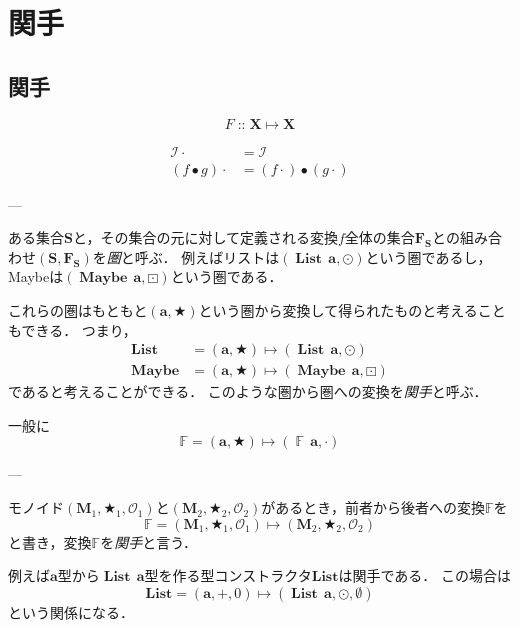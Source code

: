 \documentclass[twocolumn]{jsbook}
\newcommand{\keyword}[1]{\emph{#1}}
\newcommand{\typename}[1]{\mathbf{#1}}
\newcommand{\typeconstructor}[2]{\mathop{#1}\,#2}
\newcommand{\typelist}{\typename{List}}
\newcommand{\typemaybe}{\typename{Maybe}}
\newcommand{\constantempty}{\emptyset}
\newcommand{\binarycompose}{\bullet}
\newcommand{\binaryfunctormap}{\cdot}
\newcommand{\binarylistfunctormap}{\odot}
\newcommand{\binarymaybefunctormap}{\boxdot}
\newcommand{\istypeof}{\mathop{::}}
\newcommand{\mathbinaryop}{\bigstar}
\newcommand{\mathidentity}{\mathcal{O}}
\newcommand{\mathidentitymorph}{\mathcal{I}}
\newcommand{\mathsetname}[1]{\boldsymbol{#1}}
\newcommand{\mathfunctorname}[1]{\mathbb{#1}}
\begin{document}
\chapter{関手}

\section{関手}

$$F\istypeof\mathsetname{X}\mapsto\mathsetname{X}$$

\begin{align}
\mathidentitymorph\binaryfunctormap&=\mathidentitymorph\\
(f\binarycompose g)\binaryfunctormap&=(f\binaryfunctormap)\binarycompose(g\binaryfunctormap)
\end{align}


---

ある集合$\mathsetname{S}$と，その集合の元に対して定義される変換$f$全体の集合$\mathsetname{F}_{\mathsetname{S}}$との組み合わせ$(\mathsetname{S},\mathsetname{F}_{\mathsetname{S}})$を\keyword{圏}と呼ぶ．
例えばリストは$(\typeconstructor{\typelist}{\typename{a}},\binarylistfunctormap)$という圏であるし，Maybeは$(\typeconstructor{\typemaybe}{\typename{a}},\binarymaybefunctormap)$という圏である．

これらの圏はもともと$(\typename{a},\mathbinaryop)$という圏から変換して得られたものと考えることもできる．
つまり，
\begin{align*}
\typelist&=(\typename{a},\mathbinaryop)\mapsto(\typeconstructor{\typelist}{\typename{a}},\binarylistfunctormap)\\
\typemaybe&=(\typename{a},\mathbinaryop)\mapsto(\typeconstructor{\typemaybe}{\typename{a}},\binarymaybefunctormap)
\end{align*}
であると考えることができる．
このような圏から圏への変換を\keyword{関手}と呼ぶ．

一般に$$\mathfunctorname{F}=(\mathsetname{a},\mathbinaryop)\mapsto(\typeconstructor{\mathfunctorname{F}}{\typename{a}},\binaryfunctormap)$$


---

モノイド$(\mathsetname{M}_1,\mathbinaryop_1,\mathidentity_1)$と$(\mathsetname{M}_2,\mathbinaryop_2,\mathidentity_2)$があるとき，前者から後者への変換$\mathfunctorname{F}$を$$\mathfunctorname{F}=(\mathsetname{M}_1,\mathbinaryop_1,\mathidentity_1)\mapsto (\mathsetname{M}_2,\mathbinaryop_2,\mathidentity_2)$$と書き，変換$\mathfunctorname{F}$を\keyword{関手}と言う．

例えば$\typename{a}$型から$\typeconstructor{\typelist}{\typename{a}}$型を作る型コンストラクタ$\typelist$は関手である．
この場合は$$\typelist=(\typename{a},+,0)\mapsto(\typeconstructor{\typelist}{\typename{a}},\binarylistfunctormap,\constantempty)$$という関係になる．
\end{document}
